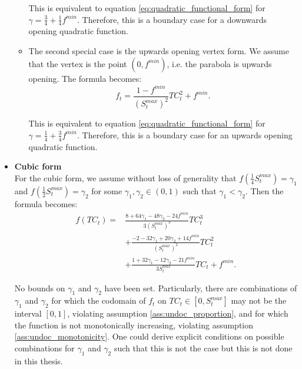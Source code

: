 \documentclass[12pt]{article}
\begin{document}
\begin{itemize}
\begin{itemize}
		        This is equivalent to equation \eqref{eq:quadratic_functional_form} for $\gamma = \frac{3}{4} + \frac{1}{4} f^{min}$. Therefore, this is a boundary case for a downwards opening quadratic function.
		        
		        \item The second special case is the upwards opening vertex form. We assume that the vertex is the point $(0, f^{min})$, i.e. the parabola is upwards opening. The formula becomes:
		            \begin{equation} \label{eq:quadratic_upwards_functional_form}
		                f_t = \frac{1-f^{min}}{\left(S^{max}_t\right)^2}TC_t^2 + f^{min}.
		            \end{equation}
		            
		        This is equivalent to equation \eqref{eq:quadratic_functional_form} for $\gamma = \frac{1}{4} + \frac{3}{4}f^{min}$. Therefore, this is a boundary case for an upwards opening quadratic function.
		    \end{itemize}
		    
		\item \textbf{Cubic form}\\
		For the cubic form, we assume without loss of generality that $f\left(\frac{1}{4}S^{max}_t\right) = \gamma_1$ and $f\left(\frac{1}{2}S^{max}_t\right) = \gamma_2$ for some $\gamma_1, \gamma_2 \in (0,1)$ such that $\gamma_1 < \gamma_2$. Then the formula becomes:
		    \begin{equation} \label{eq:cubic_functional_form}
		        \begin{split}
            		f(TC_t) = &\frac{8 + 64\gamma_1 - 48\gamma_2 -24f^{min}}{3\left(S^{max}_t\right)^3}TC_t^3 \\
            		&+ \frac{-2 - 32\gamma_1 + 20\gamma_2 + 14f^{min}}{\left(S^{max}_t\right)^2}TC_t^2 \\
            		&+ \frac{1 + 32\gamma_1 - 12\gamma_2 - 21f^{min}}{3S^{max}_t}TC_t + f^{min}.
        		\end{split}
		    \end{equation}
		    
	    No bounds on $\gamma_1$ and $\gamma_2$ have been set. Particularly, there are combinations of $\gamma_1$ and $\gamma_2$ for which the codomain of $f_t$ on $TC_t \in [0, S^{max}_t]$ may not be the interval $[0, 1]$, violating assumption \ref{ass:undoc_proportion}, and for which the function is not monotonically increasing, violating assumption \ref{ass:undoc_monotonicity}. One could derive explicit conditions on possible combinations for $\gamma_1$ and $\gamma_2$ such that this is not the case but this is not done in this thesis.
	\end{itemize}
	
\end{document}
